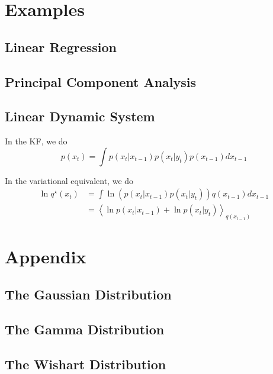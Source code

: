 \documentclass{article}
\newcommand{\<}{\langle}
\renewcommand{\>}{\rangle}
\begin{document}
\section{Examples}
\subsection{Linear Regression}
\subsection{Principal Component Analysis}

\subsection{Linear Dynamic System}
In the KF, we do
\begin{equation}
p(x_t) = \int p(x_t | x_{t-1}) p(x_t | y_t) p(x_{t-1}) d x_{t-1}
\end{equation}

In the variational equivalent, we do
\begin{equation}
\begin{split}
\ln q^\star(x_t) &= \int \ln \left( p(x_t | x_{t-1}) p(x_t | y_t) \right) q(x_{t-1}) d x_{t-1}\\
            &= \left<  \ln  p(x_t | x_{t-1})  + \ln p(x_t | y_t)  \right>_{q(x_{t-1})}
\end{split}
\end{equation}


\section{Appendix}
\subsection{The Gaussian Distribution}
\subsection{The Gamma Distribution}
\subsection{The Wishart Distribution}
\end{document}
